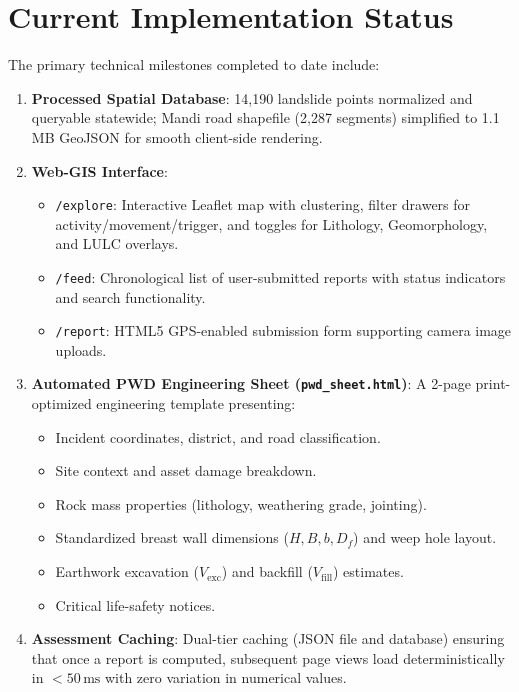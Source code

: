 \documentclass[12pt,a4paper]{report}
\begin{document}
\section{Current Implementation Status}
The primary technical milestones completed to date include:
\begin{enumerate}
    \item \textbf{Processed Spatial Database}: 14,190 landslide points normalized and queryable statewide; Mandi road shapefile (2,287 segments) simplified to 1.1\,MB GeoJSON for smooth client-side rendering.
    \item \textbf{Web-GIS Interface}:
    \begin{itemize}
        \item \texttt{/explore}: Interactive Leaflet map with clustering, filter drawers for activity/movement/trigger, and toggles for Lithology, Geomorphology, and LULC overlays.
        \item \texttt{/feed}: Chronological list of user-submitted reports with status indicators and search functionality.
        \item \texttt{/report}: HTML5 GPS-enabled submission form supporting camera image uploads.
    \end{itemize}
    \item \textbf{Automated PWD Engineering Sheet (\texttt{pwd\_sheet.html})}: A 2-page print-optimized engineering template presenting:
    \begin{itemize}
        \item Incident coordinates, district, and road classification.
        \item Site context and asset damage breakdown.
        \item Rock mass properties (lithology, weathering grade, jointing).
        \item Standardized breast wall dimensions ($H, B, b, D_f$) and weep hole layout.
        \item Earthwork excavation ($V_{\text{exc}}$) and backfill ($V_{\text{fill}}$) estimates.
        \item Critical life-safety notices.
    \end{itemize}
    \item \textbf{Assessment Caching}: Dual-tier caching (JSON file and database) ensuring that once a report is computed, subsequent page views load deterministically in $<50\,\text{ms}$ with zero variation in numerical values.
\end{enumerate}
\end{document}
